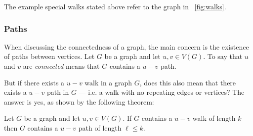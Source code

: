 The example special walks stated above refer to the graph in \figurename~\ref{fig:walks}.

\subsubsection{Paths}\label{sec:sub:sub:walkpath}

When discussing the connectedness of a graph, the main concern is the existence of paths between vertices.  Let
\(G\) be a graph and let \(u,v\in V(G)\).  To say that \(u\) and \(v\) are \emph{connected} means that \(G\)
contains a \(u-v\) path.

But if there exists a \(u-v\) walk in a graph \(G\), does this also mean that there exists a \(u-v\) path in \(G\)
--- i.e. a walk with no repeating edges or vertices?  The answer is yes, as shown by the following theorem:

\begin{theorem}
  Let \(G\) be a graph and let \(u,v\in V(G)\).  If \(G\) contains a \(u-v\) walk of length \(k\) then \(G\)
  contains a \(u-v\) path of length \(\ell\le k\).
\end{theorem}

